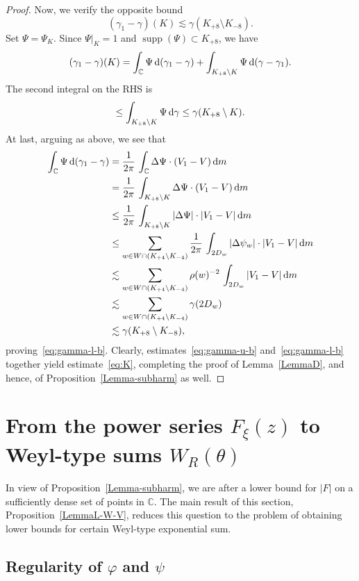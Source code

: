 \documentclass[11pt]{amsart}
\numberwithin{equation}{section}
\newcommand{\bC}{\mathbb C}
\begin{document}
\begin{proof}
Now, we verify the opposite bound
\begin{equation}\label{eq:gamma-l-b}
(\gamma_1-\gamma)(K) \lesssim \gamma(K_{+8}\setminus K_{-8}).
\end{equation}
Set $\Psi = \Psi_K$. Since $\Psi\big|_K=1$ and $\operatorname{supp}(\Psi)\subset K_{+8}$, we have
\[
(\gamma_1-\gamma)(K) = \int_{\bC} \Psi\, {\rm d}(\gamma_1-\gamma)
+ \int_{K_{+8}\setminus K} \Psi\, {\rm d}(\gamma-\gamma_1).
\]
The second integral on the RHS is
\[
\le \int_{K_{+8}\setminus K} \Psi\, {\rm d}\gamma \le \gamma(K_{+8}\setminus K).
\]
At last, arguing as above, we see that
\begin{align*}
\int_{\bC} \Psi\, {\rm d}(\gamma_1-\gamma)
&= \frac1{2\pi}\, \int_{\bC} \Delta\Psi \cdot (V_1-V)\, {\rm d} m \\
&= \frac1{2\pi}\, \int_{K_{+8}\setminus K}\Delta\Psi \cdot (V_1-V)\, {\rm d} m \\
&\le \frac1{2\pi}\, \int_{K_{+8}\setminus K}|\Delta\Psi| \cdot |V_1-V|\, {\rm d} m \\
&\le \sum_{w\in W\cap (K_{+4}\setminus K_{-4})}
\frac1{2\pi}\, \int_{2D_w} |\Delta\psi_w| \cdot |V_1-V|\, {\rm d} m \\
&\lesssim \sum_{w\in W\cap (K_{+4}\setminus K_{-4})}
\rho(w)^{-2}\, \int_{2D_w} |V_1-V|\, {\rm d} m \\
&\lesssim \sum_{w\in W\cap (K_{+4}\setminus K_{-4})} \gamma(2D_w) \\
&\lesssim \gamma(K_{+8}\setminus K_{-8}),
\end{align*}
proving~\eqref{eq:gamma-l-b}. Clearly, estimates~\eqref{eq:gamma-u-b} and~\eqref{eq:gamma-l-b}
together yield estimate~\eqref{eq:K}, completing the proof of Lemma~\ref{LemmaD}, and hence,
of Proposition~\ref{Lemma-subharm} as well. 
\end{proof}

 

\section{From the power series $F_\xi (z)$ to Weyl-type sums $W_R(\theta)$}
\label{sect:4}

In view of Proposition~\ref{Lemma-subharm}, we are after a lower bound for $|F|$
on a sufficiently dense set of points in $\bC$.
The main result of this section, Proposition~\ref{LemmaL-W-V},  reduces this question to the problem of
obtaining lower bounds for certain Weyl-type exponential sum.


\subsection{Regularity of $\varphi$ and $\psi$}
\end{document}
